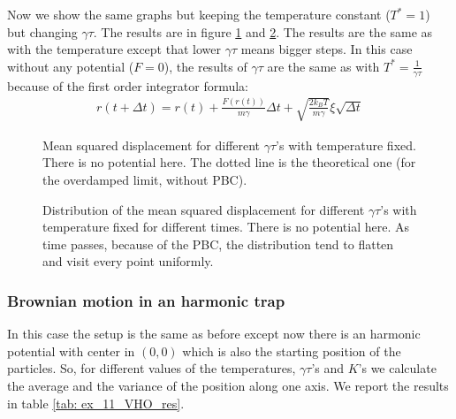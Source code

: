 \documentclass[../main.tex]{subfiles}
\begin{document}
Now we show the same graphs but keeping the temperature constant ($T^*=1$) but changing $\gamma\tau$. The results are in figure \ref{fig: ex_11_V0_gammas} and \ref{fig: ex_11_V0_gammas_distr}. The results are the same as with the temperature except that lower $\gamma\tau$ means bigger steps. In this case without any potential ($F = 0$), the results of $\gamma\tau$ are the same as with $T^*=\frac{1}{\gamma\tau}$ because of the first order integrator formula:
\begin{align}
    r(t + \Delta t) = r(t) + \frac{F(r(t))}{m\gamma} \Delta t + \sqrt{\frac{2 k_B T}{m\gamma}} \xi \sqrt{\Delta t}
\end{align}

\begin{figure}[!ht]
    \centering
    \begin{subfigure}{.85\textwidth}
        \centering
        
    \end{subfigure}
    \caption{Mean squared displacement for different $\gamma\tau$'s with temperature fixed. There is no potential here. The dotted line is the theoretical one (for the overdamped limit, without PBC).}
    \label{fig: ex_11_V0_gammas}
\end{figure}

\begin{figure}[!ht]
    \centering
    \begin{subfigure}{.95\textwidth}
        \centering
        
    \end{subfigure}
    \caption{Distribution of the mean squared displacement for different $\gamma\tau$'s with temperature fixed for different times. There is no potential here. As time passes, because of the PBC, the distribution tend to flatten and visit every point uniformly.}
    \label{fig: ex_11_V0_gammas_distr}
\end{figure}

\clearpage

\subsubsection*{Brownian motion in an harmonic trap}
In this case the setup is the same as before except now there is an harmonic potential with center in $(0,0)$ which is also the starting position of the particles. So, for different values of the temperatures, $\gamma\tau$'s and $K$'s we calculate the average and the variance of the position along one axis. We report the results in table \ref{tab: ex_11_VHO_res}.
\end{document}
